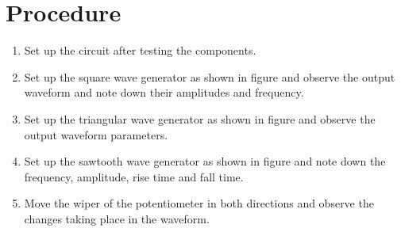 %	

\section{Procedure}
\begin{enumerate}
	\item Set up the circuit after testing the components.
	\item Set up the square wave generator as shown in figure and observe the output waveform and note down their amplitudes and frequency.
	\item Set up the triangular wave generator as shown in figure and observe the output waveform parameters.
	\item Set up the sawtooth wave generator as shown in figure and note down the frequency, amplitude, rise time and fall time.
	\item Move the wiper of the potentiometer in both directions and observe the changes
	taking place in the waveform.
\end{enumerate}


%

